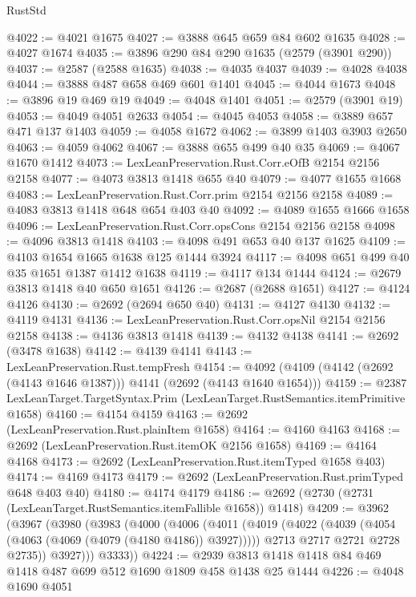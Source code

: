 \begin{lexlean}{RustStd}
\begin{coremodule}
{\begin{coremodule}
{{{{{{{{{{@4022 := @4021 @1675
@4027 := @3888 @645 @659 @84 @602 @1635
@4028 := @4027 @1674
@4035 := @3896 @290 @84 @290 @1635 (@2579 (@3901 @290))
@4037 := @2587 (@2588 @1635)
@4038 := @4035 @4037
@4039 := @4028 @4038
@4044 := @3888 @487 @658 @469 @601 @1401
@4045 := @4044 @1673
@4048 := @3896 @19 @469 @19
@4049 := @4048 @1401
@4051 := @2579 (@3901 @19)
@4053 := @4049 @4051 @2633
@4054 := @4045 @4053
@4058 := @3889 @657 @471 @137 @1403
@4059 := @4058 @1672
@4062 := @3899 @1403 @3903 @2650
@4063 := @4059 @4062
@4067 := @3888 @655 @499 @40 @35
@4069 := @4067 @1670 @1412
@4073 := LexLeanPreservation.Rust.Corr.eOfB @2154 @2156 @2158
@4077 := @4073 @3813 @1418 @655 @40
@4079 := @4077 @1655 @1668
@4083 := LexLeanPreservation.Rust.Corr.prim @2154 @2156 @2158
@4089 := @4083 @3813 @1418 @648 @654 @403 @40
@4092 := @4089 @1655 @1666 @1658
@4096 := LexLeanPreservation.Rust.Corr.opsCons @2154 @2156 @2158
@4098 := @4096 @3813 @1418
@4103 := @4098 @491 @653 @40 @137 @1625
@4109 := @4103 @1654 @1665 @1638 @125 @1444 @3924
@4117 := @4098 @651 @499 @40 @35 @1651 @1387 @1412 @1638
@4119 := @4117 @134 @1444
@4124 := @2679 @3813 @1418 @40 @650 @1651
@4126 := @2687 (@2688 @1651)
@4127 := @4124 @4126
@4130 := @2692 (@2694 @650 @40)
@4131 := @4127 @4130
@4132 := @4119 @4131
@4136 := LexLeanPreservation.Rust.Corr.opsNil @2154 @2156 @2158
@4138 := @4136 @3813 @1418
@4139 := @4132 @4138
@4141 := @2692 (@3478 @1638)
@4142 := @4139 @4141
@4143 := LexLeanPreservation.Rust.tempFresh
@4154 := @4092 (@4109 (@4142 (@2692 (@4143 @1646 @1387))) @4141 (@2692 (@4143 @1640 @1654)))
@4159 := @2387 LexLeanTarget.TargetSyntax.Prim (LexLeanTarget.RustSemantics.itemPrimitive @1658)
@4160 := @4154 @4159
@4163 := @2692 (LexLeanPreservation.Rust.plainItem @1658)
@4164 := @4160 @4163
@4168 := @2692 (LexLeanPreservation.Rust.itemOK @2156 @1658)
@4169 := @4164 @4168
@4173 := @2692 (LexLeanPreservation.Rust.itemTyped @1658 @403)
@4174 := @4169 @4173
@4179 := @2692 (LexLeanPreservation.Rust.primTyped @648 @403 @40)
@4180 := @4174 @4179
@4186 := @2692 (@2730 (@2731 (LexLeanTarget.RustSemantics.itemFallible @1658)) @1418)
@4209 := @3962
    (@3967
      (@3980
        (@3983
          (@4000
            (@4006
              (@4011
                (@4019
                  (@4022 (@4039 (@4054 (@4063 (@4069 (@4079 (@4180 @4186)) @3927)))))
                  @2713
                  @2717
                  @2721
                  @2728
                  @2735))
              @3927)))
        @3333))
@4224 := @2939 @3813 @1418 @1418 @84 @469 @1418 @487 @699 @512 @1690 @1809 @458 @1438 @25 @1444
@4226 := @4048 @1690 @4051
}}}}}}}}}}
\end{coremodule}}
\end{coremodule}
\end{lexlean}
